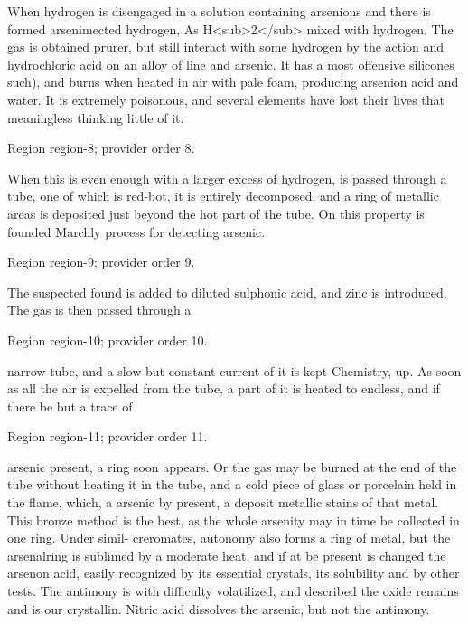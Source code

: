 \documentclass[11pt]{article}
\begin{document}
When hydrogen is disengaged in a solution containing arsenions and there is formed arsenimected hydrogen, As H<sub>2</sub> mixed with hydrogen. The gas is obtained prurer, but still interact with some hydrogen by the action and hydrochloric acid on an alloy of line and arsenic. It has a most offensive silicones such), and burns when heated in air with pale foam, producing arsenion acid and water. It is extremely poisonous, and several elements have lost their lives that meaningless thinking little of it.
\par

{\scriptsize\color{gray} Region region-8; provider order 8.\par}
\medskip

When this is even enough with a larger excess of hydrogen, is passed through a tube, one of which is red-bot, it is entirely decomposed, and a ring of metallic areas is deposited just beyond the hot part of the tube. On this property is founded Marchly process for detecting arsenic.
\par

{\scriptsize\color{gray} Region region-9; provider order 9.\par}
\medskip

The suspected found is added to diluted sulphonic acid, and zinc is introduced. The gas is then passed through a
\par

{\scriptsize\color{gray} Region region-10; provider order 10.\par}
\medskip

narrow tube, and a slow but constant current of it is kept Chemistry, up. As soon as all the air is expelled from the tube, a part of it is heated to endless, and if there be but a trace of
\par

{\scriptsize\color{gray} Region region-11; provider order 11.\par}
\medskip

arsenic present, a ring soon appears. Or the gas may be burned at the end of the tube without heating it in the tube, and a cold piece of glass or porcelain held in the flame, which, a arsenic by present, a deposit metallic stains of that metal. This bronze method is the best, as the whole arsenity may in time be collected in one ring. Under simil- creromates, autonomy also forms a ring of metal, but the arsenalring is sublimed by a moderate heat, and if at be present is changed the arsenon acid, easily recognized by its essential crystals, its solubility and by other tests. The antimony is with difficulty volatilized, and described the oxide remains and is our crystallin. Nitric acid dissolves the arsenic, but not the antimony.
\par
\end{document}

